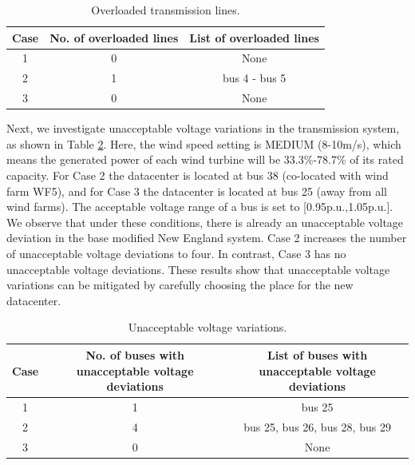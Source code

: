 \begin{table}[ht]
\begin{center}
\caption{Overloaded transmission lines.}
\begin{tabular}{|c|c|c|}
\hline
{\bf Case} & {\bf No. of overloaded lines} & {\bf List of overloaded lines} \\
\hline
1 & 0 & None\\
2 & 1 &  bus 4 - bus 5 \\
3 & 0 & None \\

\hline

\end{tabular}
\label{tab:results-linevio}
\end{center}
\end{table}

Next, we investigate unacceptable voltage variations in the
transmission system, as shown in Table \ref{tab:results-volvio}. Here,
the wind speed setting is MEDIUM (8-10m/s), which means the generated
power of each wind turbine will be 33.3\%-78.7\% of its rated
capacity.  For Case 2 the datacenter is located at bus 38 (co-located
with wind farm WF5), and for Case 3 the datacenter is located at bus
25 (away from all wind farms). The acceptable voltage range of a bus
is set to [0.95p.u.,1.05p.u.].  We observe that under these
conditions, there is already an unacceptable voltage deviation in the
base modified New England system.  Case 2 increases the number of
unacceptable voltage deviations to four.  In contrast, Case 3 has no
unacceptable voltage deviations.  These results show that unacceptable
voltage variations can be mitigated by carefully choosing the place
for the new datacenter.

\begin{table}[ht]
\begin{center}
\caption{Unacceptable voltage variations.}
\begin{tabular}{|c|c|c|}
\hline
{\bf Case} & \multicolumn{1}{p{1.25in}|}{\bf No. of buses with unacceptable voltage deviations} &
\multicolumn{1}{p{1.25in}|}{\bf List of buses with unacceptable voltage deviations}  \\
\hline
1 & 1 & bus 25\\
\hline
2 & 4 & bus 25, bus 26, bus 28, bus 29\\
\hline
3 & 0 & None \\

\hline

\end{tabular}
\label{tab:results-volvio}
\end{center}
\end{table}

